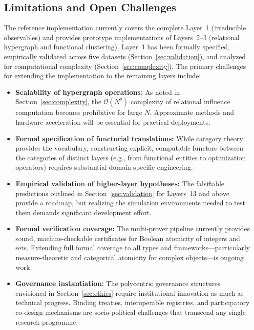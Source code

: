 \subsection{Limitations and Open Challenges}

The reference implementation currently covers the complete Layer~1 (irreducible observables) and provides prototype implementations of Layers~2--3 (relational hypergraph and functional clustering). Layer~1 has been formally specified, empirically validated across five datasets (Section~\ref{sec:validation}), and analyzed for computational complexity (Section~\ref{sec:complexity}). The primary challenges for extending the implementation to the remaining layers include:

\begin{itemize}
    \item \textbf{Scalability of hypergraph operations:} As noted in Section~\ref{sec:complexity}, the $\mathcal{O}(N^2)$ complexity of relational influence computation becomes prohibitive for large $N$. Approximate methods and hardware acceleration will be essential for practical deployments.
    \item \textbf{Formal specification of functorial translations:} While category theory provides the vocabulary, constructing explicit, computable functors between the categories of distinct layers (e.g., from functional entities to optimization operators) requires substantial domain-specific engineering.
    \item \textbf{Empirical validation of higher-layer hypotheses:} The falsifiable predictions outlined in Section~\ref{sec:validation} for Layers~13 and above provide a roadmap, but realizing the simulation environments needed to test them demands significant development effort.
    \item \textbf{Formal verification coverage:} The multi-prover pipeline currently provides sound, machine-checkable certificates for Boolean atomicity of integers and sets. Extending full formal coverage to all types and frameworks---particularly measure-theoretic and categorical atomicity for complex objects---is ongoing work.
    \item \textbf{Governance instantiation:} The polycentric governance structures envisioned in Section~\ref{sec:ethics} require institutional innovation as much as technical progress. Binding treaties, interoperable registries, and participatory co-design mechanisms are socio-political challenges that transcend any single research programme.
\end{itemize}

